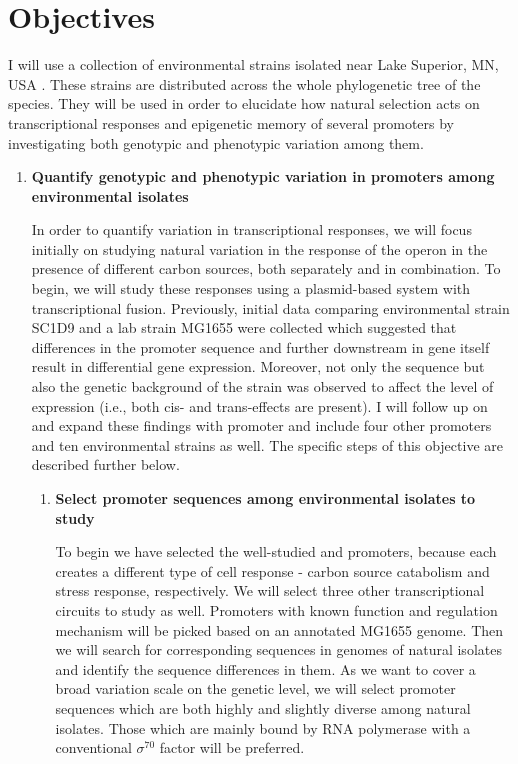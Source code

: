 \chapter*{Objectives}

\shorthandoff{-} 

I will use a collection of environmental  strains isolated near Lake Superior, MN, USA \cite{ishii2006presence}.
These strains are distributed across the whole phylogenetic tree of the species.
They will be used in order to elucidate how natural selection acts on transcriptional responses and epigenetic memory of several promoters by investigating both genotypic and phenotypic variation among them.

\begin{enumerate}[font=\bfseries]

    \item \textbf{Quantify genotypic and phenotypic variation in promoters among environmental  isolates}
    
    In order to quantify variation in transcriptional responses, we will focus initially on studying natural variation in the response of the  operon in the presence of different carbon sources, both separately and in combination.
    To begin, we will study these responses using a plasmid-based system with transcriptional fusion.
    Previously, initial data comparing environmental strain SC1\textunderscore D9 and a lab strain MG1655 were collected which suggested that differences in the  promoter sequence and further downstream in  gene itself result in differential gene expression.
    Moreover, not only the sequence but also the genetic background of the strain was observed to affect the level of expression (i.e., both cis- and trans-effects are present).
    I will follow up on and expand these findings with  promoter and include four other promoters and ten environmental  strains as well.
    The specific steps of this objective are described further below.

    \begin{enumerate}[font=\bfseries]
    
        \item \textbf{Select promoter sequences among environmental  isolates to study}
        
        To begin we have selected the well-studied  and  promoters, because each creates a different type of cell response - carbon source catabolism and stress response, respectively.
        We will select three other transcriptional circuits to study as well.
        Promoters with known function and regulation mechanism will be picked based on an annotated MG1655 genome.
        Then we will search for corresponding sequences in genomes of natural isolates and identify the sequence differences in them.
        As we want to cover a broad variation scale on the genetic level, we will select promoter sequences which are both highly and slightly diverse among natural isolates.
        Those which are mainly bound by RNA polymerase with a conventional $\sigma^{70}$ factor will be preferred.


\end{enumerate}
\end{enumerate}
